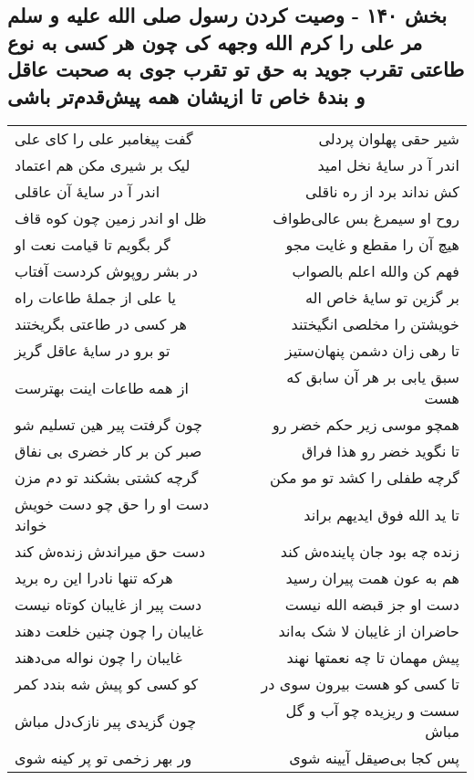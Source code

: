 \begin{center}
\section*{بخش ۱۴۰ - وصیت کردن رسول صلی الله علیه و سلم مر علی را کرم الله وجهه کی چون هر کسی به نوع طاعتی تقرب جوید به حق تو تقرب جوی به صحبت عاقل و بندهٔ خاص تا ازیشان همه پیش‌قدم‌تر باشی}
\label{sec:sh140}
\begin{longtable}{l p{0.5cm} r}
گفت پیغامبر علی را کای علی
&&
شیر حقی پهلوان پردلی
\\
لیک بر شیری مکن هم اعتماد
&&
اندر آ در سایهٔ نخل امید
\\
اندر آ در سایهٔ آن عاقلی
&&
کش نداند برد از ره ناقلی
\\
ظل او اندر زمین چون کوه قاف
&&
روح او سیمرغ بس عالی‌طواف
\\
گر بگویم تا قیامت نعت او
&&
هیچ آن را مقطع و غایت مجو
\\
در بشر روپوش کردست آفتاب
&&
فهم کن والله اعلم بالصواب
\\
یا علی از جملهٔ طاعات راه
&&
بر گزین تو سایهٔ خاص اله
\\
هر کسی در طاعتی بگریختند
&&
خویشتن را مخلصی انگیختند
\\
تو برو در سایهٔ عاقل گریز
&&
تا رهی زان دشمن پنهان‌ستیز
\\
از همه طاعات اینت بهترست
&&
سبق یابی بر هر آن سابق که هست
\\
چون گرفتت پیر هین تسلیم شو
&&
همچو موسی زیر حکم خضر رو
\\
صبر کن بر کار خضری بی نفاق
&&
تا نگوید خضر رو هذا فراق
\\
گرچه کشتی بشکند تو دم مزن
&&
گرچه طفلی را کشد تو مو مکن
\\
دست او را حق چو دست خویش خواند
&&
تا ید الله فوق ایدیهم براند
\\
دست حق میراندش زنده‌ش کند
&&
زنده چه بود جان پاینده‌ش کند
\\
هرکه تنها نادرا این ره برید
&&
هم به عون همت پیران رسید
\\
دست پیر از غایبان کوتاه نیست
&&
دست او جز قبضه الله نیست
\\
غایبان را چون چنین خلعت دهند
&&
حاضران از غایبان لا شک به‌اند
\\
غایبان را چون نواله می‌دهند
&&
پیش مهمان تا چه نعمتها نهند
\\
کو کسی کو پیش شه بندد کمر
&&
تا کسی کو هست بیرون سوی در
\\
چون گزیدی پیر نازک‌دل مباش
&&
سست و ریزیده چو آب و گل مباش
\\
ور بهر زخمی تو پر کینه شوی
&&
پس کجا بی‌صیقل آیینه شوی
\\
\end{longtable}
\end{center}
